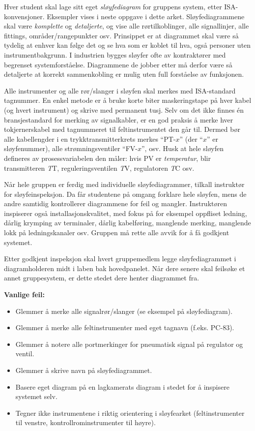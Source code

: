 \vskip 5pt

Hver student skal lage sitt eget {\it sløyfediagram} for gruppens system, etter ISA-konvensjoner. Eksempler vises i neste oppgave i dette arket. Sløyfediagrammene skal være {\it komplette} og {\it detaljerte}, og vise alle rørtilkoblinger, alle signallinjer, alle fittings, områder/rangepunkter osv. Prinsippet er at diagrammet skal være så tydelig at enhver kan følge det og se hva som er koblet til hva, også personer uten instrumentbakgrunn. I industrien bygges sløyfer ofte av kontraktører med begrenset systemforståelse. Diagrammene de jobber etter må derfor være så detaljerte at korrekt sammenkobling er mulig uten full forståelse av funksjonen.

Alle instrumenter og alle rør/slanger i sløyfen skal merkes med ISA-standard tagnummer. En enkel metode er å bruke korte biter maskeringstape på hver kabel (og hvert instrument) og skrive med permanent tusj. Selv om det ikke finnes én bransjestandard for merking av signalkabler, er en god praksis å merke hver tokjernerskabel med tagnummeret til feltinstrumentet den går til. Dermed bør alle kabellengder i en trykktransmitterkrets merkes ``PT-$x$'' (der ``$x$'' er sløyfenummer), alle strømningsventiler ``FV-$x$'', osv. Husk at hele sløyfen defineres av prosessvariabelen den måler: hvis PV er {\it temperatur}, blir transmitteren {\it T}T, reguleringsventilen {\it T}V, regulatoren {\it T}C osv.

Når hele gruppen er ferdig med individuelle sløyfediagrammer, tilkall instruktør for sløyfeinspeksjon. Da får studentene på omgang forklare hele sløyfen, mens de andre samtidig kontrollerer diagrammene for feil og mangler. Instruktøren inspiserer også installasjonskvalitet, med fokus på for eksempel oppfliset ledning, dårlig krymping av terminaler, dårlig kabelføring, manglende merking, manglende lokk på ledningskanaler osv. Gruppen må rette alle avvik for å få godkjent systemet.

Etter godkjent inspeksjon skal hvert gruppemedlem legge sløyfediagrammet i diagramholderen midt i laben bak hovedpanelet. Når dere senere skal feilsøke et annet gruppesystem, er dette stedet dere henter diagrammet fra.

\vskip 10pt

{\bf Vanlige feil:}

\begin{itemize}
\item{} Glemmer å merke alle signalrør/slanger (se eksempel på sløyfediagram).
\item{} Glemmer å merke alle feltinstrumenter med eget tagnavn (f.eks. PC-83).
\item{} Glemmer å notere alle portmerkinger for pneumatisk signal på regulator og ventil.
\item{} Glemmer å skrive navn på sløyfediagrammet.
\item{} Basere eget diagram på en lagkamerats diagram i stedet for å inspisere systemet selv.
\item{} Tegner ikke instrumentene i riktig orientering i sløyfearket (feltinstrumenter til venstre, kontrollrominstrumenter til høyre).
\end{itemize}

